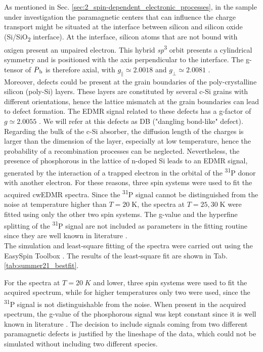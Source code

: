\documentclass[a4paper]{book}
\begin{document}
	As mentioned in Sec. \ref{sec:2_spin-dependent_electronic_processes}, in the sample under investigation the paramagnetic centers that can influence the charge transport might be situated at the interface between silicon and silicon oxide (Si/SiO\textsubscript{2} interface). At the interface, silicon atoms that are not bound with oxigen present an unpaired electron. This hybrid \textit{sp}\textsuperscript{3} orbit presents a cylindrical symmetry and is positioned with the axis perpendicular to the interface. The g-tensor of $P\textsubscript{b}$ is therefore axial, with $g_\parallel \simeq 2.0018$ and $g_\perp \simeq 2.0081$ \cite{stesmansElectronSpinResonance2014}. \\
	Moreover, defects could be present at the grain boundaries of the poly-crystalline silicon (poly-Si) layers. These layers are constituted by several c-Si grains with different orientations, hence the lattice mismatch at the grain boundaries can lead to defect formation. The EDMR signal related to these defects has a g-factor of $g \simeq 2.0055$ \cite{}. We will refer at this defects as DB ("dangling bond-like" defect).\\
	Regarding the bulk of the c-Si absorber, the diffusion length of the charges is larger than the dimension of the layer, especially at low temperature, hence the probability of a recombination processes can be neglected. Nevertheless, the presence of phosphorous in the lattice of n-doped Si leads to an EDMR signal, generated by the interaction of a trapped electron in the orbital of the \textsuperscript{31}P donor with another electron. For these reasons, three spin systems were used to fit the acquired cwEDMR spectra. Since the \textsuperscript{31}P signal cannot be distinguished from the noise at temperature higher than $T = 20 \; \text{K}$, the spectra at $T = 25, 30 \; \text{K}$ were fitted using only the other two spin systems. The g-value and the hyperfine splitting of the \textsuperscript{31}P signal are not included as parameters in the fitting routine since they are well known in literature \cite{stegnerElectricalDetectionCoherent2006}.\\
	The simulation and least-square fitting of the spectra were carried out using the EasySpin Toolbox \cite{stollEasySpinComprehensiveSoftware2006}. The results of the least-square fit are shown in Tab. \ref{tab:summer21_bestfit}.\\
	\iffalse
	
	For the spectra at $T=20\;K$ and lower, three spin systems were used to fit the acquired spectrum, while for higher temperatures only two were used, since the \textsuperscript{31}P signal is not distinguishable from the noise. When present in the acquired spectrum, the g-value of the phosphorous signal was kept constant since it is well known in literature . The decision to include signals coming from two different paramagnetic defects is justified by the lineshape of the data, which could not be simulated without including two different species.\\
	
\end{document}
